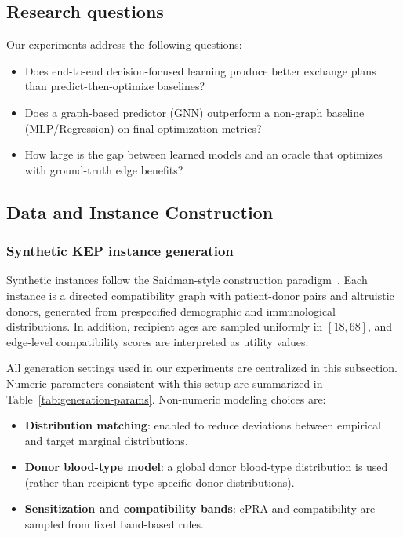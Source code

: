 \documentclass{article}
\begin{document}
\subsection{Research questions}
Our experiments address the following questions:
\begin{itemize}
    \item Does end-to-end decision-focused learning produce better exchange plans than predict-then-optimize baselines?
    \item Does a graph-based predictor (GNN) outperform a non-graph baseline (MLP/Regression) on final optimization metrics?
    \item How large is the gap between learned models and an oracle that optimizes with ground-truth edge benefits?
\end{itemize}

\subsection{Data and Instance Construction}
\subsubsection{Synthetic KEP instance generation}
Synthetic instances follow the Saidman-style construction paradigm~\citep{saidman2006increasing}. Each instance is a directed compatibility graph with patient-donor pairs and altruistic donors, generated from prespecified demographic and immunological distributions. In addition, recipient ages are sampled uniformly in \([18,68]\), and edge-level compatibility scores are interpreted as utility values.

All generation settings used in our experiments are centralized in this subsection. Numeric parameters consistent with this setup are summarized in Table~\ref{tab:generation-params}. Non-numeric modeling choices are:
\begin{itemize}
    \item \textbf{Distribution matching}: enabled to reduce deviations between empirical and target marginal distributions.
    \item \textbf{Donor blood-type model}: a global donor blood-type distribution is used (rather than recipient-type-specific donor distributions).
    \item \textbf{Sensitization and compatibility bands}: cPRA and compatibility are sampled from fixed band-based rules.
\end{itemize}
\end{document}
